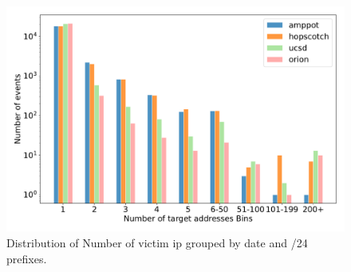 \begin{figure}[htbp]
    \centering
    \includegraphics[scale=0.48]{graphs/space_bin_log.pdf}
    \caption{Distribution of Number of victim ip grouped by date and /24 prefixes.}
    \label{fig:akamai_spikes}
\end{figure}





